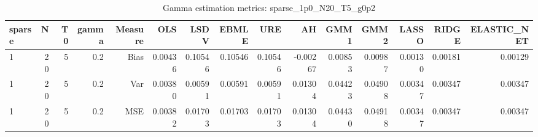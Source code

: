 \begin{table}[!htbp]\centering
\caption{Gamma estimation metrics: sparse_1p0_N20_T5_g0p2}
\label{tab:table1_sparse_1p0_N20_T5_g0p2}
\begin{tabular}{lrrrrrrrrrrrrrr}
\hline
sparse & N & T0 & gamma & Measure & OLS & LSDV & EBMLE & URE & AH & GMM1 & GMM2 & LASSO & RIDGE & ELASTIC_NET \\
\hline
1 & 20 & 5 & 0.2 & Bias & 0.00436 & 0.10546 & 0.10546 & 0.10546 & -0.00267 & 0.00853 & 0.00987 & 0.00130 & 0.00181 & 0.00129 \\
1 & 20 & 5 & 0.2 & Var & 0.00380 & 0.00591 & 0.00591 & 0.00591 & 0.01304 & 0.04423 & 0.04908 & 0.00347 & 0.00347 & 0.00347 \\
1 & 20 & 5 & 0.2 & MSE & 0.00382 & 0.01703 & 0.01703 & 0.01703 & 0.01304 & 0.04430 & 0.04918 & 0.00347 & 0.00347 & 0.00347 \\
\hline
\end{tabular}
\end{table}

